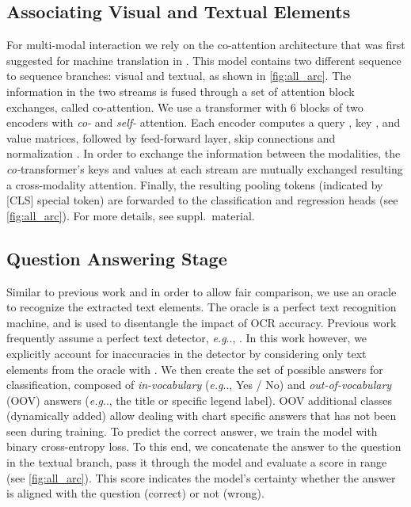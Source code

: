 \documentclass[runningheads]{llncs}
\makeatletter
\DeclareRobustCommand\onedot{\futurelet\@let@token\@onedot}
\def\@onedot{\ifx\@let@token.\else.\null\fi\xspace}
\def\eg{\emph{e.g}\onedot} \def\Eg{\emph{E.g}\onedot}
\makeatother
\begin{document}
\subsection{Associating Visual and Textual Elements}
\label{sec:associating_visual_and_textual}
For multi-modal interaction we rely on the co-attention architecture that was first suggested for machine translation in \cite{neuralMachineTranslation_ICLR15}. This model contains two different sequence to sequence branches: visual and textual, as shown in \cref{fig:all_arc}. The information in the two streams is fused through a set of attention block exchanges, called co-attention. We use a transformer with 6 blocks of two encoders with {\it co-} and {\it self-} attention. Each encoder computes a query , key , and value  matrices, followed by feed-forward layer, skip connections and normalization \cite{vaswani2017attention}. In order to exchange the information between the modalities, the {\it co-}transformer's keys and values at each stream are mutually exchanged resulting a cross-modality attention.
Finally, the resulting  pooling tokens (indicated by [CLS] special token) are forwarded to the classification and regression heads (see \cref{fig:all_arc}). For more details, see suppl.~material.


\subsection{Question Answering Stage}
\label{sec:question_answering_stage}
Similar to previous work \cite{chartqa, prefil, chaudhry2019leafqa, dvqa, plotqa} and in order to allow fair comparison, we use an oracle to recognize the extracted text elements. The oracle is a perfect text recognition machine, and is used to disentangle the impact of OCR accuracy. Previous work frequently assume a perfect text detector, \eg, \cite{figureqa, dvqa, chartqa, plotqa}. In this work however, we explicitly account for inaccuracies in the detector by considering only text elements from the oracle with . We then create the set of possible answers for classification, composed of {\it in-vocabulary} (\eg, Yes / No) and {\it out-of-vocabulary} (OOV) answers (\eg, the title or specific legend label).
OOV additional classes (dynamically added) allow dealing with chart specific answers that has not been seen during training. To predict the correct answer, we train the model with binary cross-entropy loss. To this end, we concatenate the answer to the question in the textual branch, pass it through the model and evaluate a score in  range (see \cref{fig:all_arc}). This score indicates the model's certainty whether the answer is aligned with the question (correct) or not (wrong).
\end{document}
